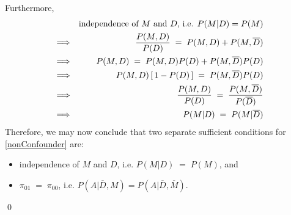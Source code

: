 Furthermore,
\begin{eqnarray*}
&&                \textnormal{independence of $M$ and $D$, i.e. $P(M \vert D) = P(M)$} \\
&\Longrightarrow& \dfrac{P(M,D)}{P(D)} \; = \; P(M,D) + P(M,\overline{D}) \\
&\Longrightarrow& P(M,D) \; = \; P(M,D)P(D) + P(M,\overline{D}) P(D) \\
&\Longrightarrow& P(M,D)\left[\,1 - P(D)\,\right] \; = \; P(M,\overline{D}) P(D) \\
&\Longrightarrow& \dfrac{P(M,D)}{P(D)}\;=\;\dfrac{P(M,\overline{D})}{P(\overline{D})} \\
&\Longrightarrow& P(M \vert D) \;=\; P(M \vert \overline{D}) \\
\end{eqnarray*}
Therefore, we may now conclude that two separate sufficient conditions for \eqref{nonConfounder} are:
\begin{itemize}
\item 	independence of $M$ and $D$, i.e. $P(M \vert D) \; = \; P(M)$, and
\item 	$\pi_{01} \; = \; \pi_{00}$, i.e.
		$P(A \vert \overline{D},M) = P(A \vert \overline{D},\overline{M})$.
\end{itemize}
\qed

